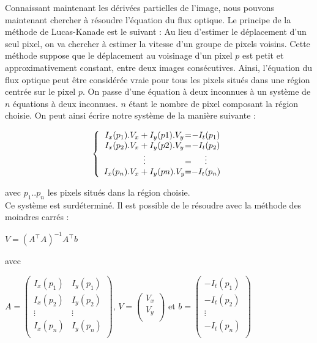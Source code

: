 Connaissant maintenant les dérivées partielles de l'image, nous pouvons maintenant chercher à résoudre l'équation du flux optique. Le principe de la méthode de Lucas-Kanade est le suivant : Au lieu d'estimer le déplacement d'un seul pixel, on va chercher à estimer la vitesse d'un groupe de pixels voisins. Cette méthode suppose que le déplacement au voisinage d'un pixel $p$ est petit et approximativement constant, entre deux images consécutives. Ainsi, l'équation du flux optique peut être considérée vraie pour tous les pixels situés dans une région centrée sur le pixel $p$. On passe d'une équation à deux inconnues à un système de $ n $ équations à deux inconnues. $n$ étant le nombre de pixel composant la région choisie. On peut ainsi écrire notre système de la manière suivante :

\[
 \left \{
 \begin{array}{c @{=} c}
     I_x(p_1).V_x + I_y(p1).V_y & -I_t(p_1) \\
     I_x(p_2).V_x + I_y(p2).V_y & -I_t(p_2) \\
     \vdots & \vdots \\
     I_x(p_n).V_x + I_y(pn).V_y & -I_t(p_n) \\
 \end{array}
 \right.
\]

avec $p_1..p_n$ les pixels situés dans la région choisie.\\

Ce système est surdéterminé. Il est possible de le résoudre avec la méthode des moindres carrés :

\begin{center}
$V = (A^\intercal A)^{-1} A^\intercal b$
\end{center}

avec 

\begin{center}
$
 A = \begin{pmatrix}
     I_x(p_1) & I_y(p_1) \\
     I_x(p_2) & I_y(p_2) \\
     \vdots & \vdots \\
     I_x(p_n) & I_y(p_n) \\
 \end{pmatrix}
$, 
$
 V = \begin{pmatrix}
     V_x \\
     V_y \\
 \end{pmatrix}
$
 et 
$
 b = \begin{pmatrix}
     -I_t(p_1) \\
     -I_t(p_2) \\
     \vdots \\
     -I_t(p_n) \\
 \end{pmatrix}
$
\end{center}

